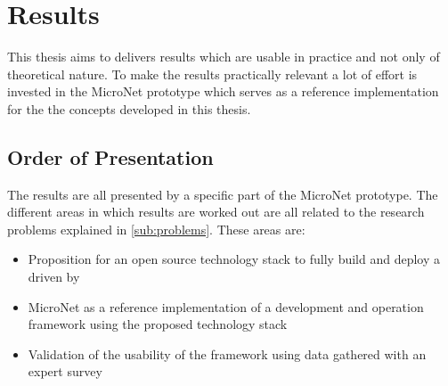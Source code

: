\chapter{Results}

This thesis aims to delivers results which are usable in practice and not only
of theoretical nature. To make the results practically relevant a lot of effort
is invested in the MicroNet prototype which serves as a reference implementation
for the the concepts developed in this thesis.

\section{Order of Presentation}

The results are all presented by a specific part of the MicroNet prototype. The
different areas in which results are worked out are all related to the research
problems explained in \autoref{sub:problems}. These areas are:

\begin{itemize}
  \item Proposition for an  open source technology stack to fully build and
  deploy a \og{} driven by \mss{}
  \item MicroNet as a reference implementation of a \ms{} \og{} development and
  operation framework using the proposed technology stack
  \item Validation of the usability of the framework using data gathered with an
  expert survey 
\end{itemize}


\newpage

\newpage
